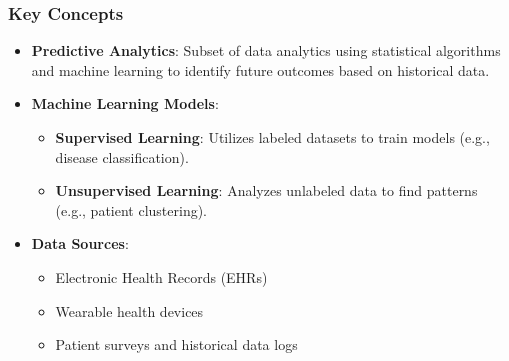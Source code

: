 \documentclass{beamer}
\begin{document}
\begin{frame}[fragile]
    \frametitle{Key Concepts}
    \begin{itemize}
        \item \textbf{Predictive Analytics}: Subset of data analytics using statistical algorithms and machine learning to identify future outcomes based on historical data.
        \item \textbf{Machine Learning Models}:
        \begin{itemize}
            \item \textbf{Supervised Learning}: Utilizes labeled datasets to train models (e.g., disease classification).
            \item \textbf{Unsupervised Learning}: Analyzes unlabeled data to find patterns (e.g., patient clustering).
        \end{itemize}
        \item \textbf{Data Sources}:
        \begin{itemize}
            \item Electronic Health Records (EHRs)
            \item Wearable health devices
            \item Patient surveys and historical data logs
        \end{itemize}
    \end{itemize}
\end{frame}
\end{document}
